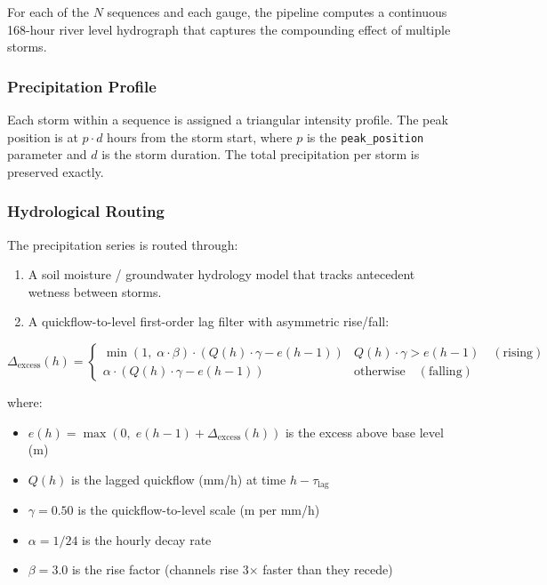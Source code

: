 \documentclass[11pt,a4paper]{article}
\begin{document}
For each of the $N$ sequences and each gauge, the pipeline computes a
continuous 168-hour river level hydrograph that captures the compounding
effect of multiple storms.

\subsubsection{Precipitation Profile}

Each storm within a sequence is assigned a triangular intensity profile.
The peak position is at $p \cdot d$ hours from the storm start, where $p$
is the \texttt{peak\_position} parameter and $d$ is the storm duration.
The total precipitation per storm is preserved exactly.

\subsubsection{Hydrological Routing}

The precipitation series is routed through:
\begin{enumerate}[nosep]
    \item A soil moisture / groundwater hydrology model that tracks
          antecedent wetness between storms.
    \item A quickflow-to-level first-order lag filter with asymmetric
          rise/fall:
\end{enumerate}

\[
\Delta_{\text{excess}}(h) = \begin{cases}
\min\!\left(1,\; \alpha \cdot \beta\right) \cdot
    \left(Q(h) \cdot \gamma - e(h{-}1)\right)
    & Q(h) \cdot \gamma > e(h{-}1) \quad (\text{rising}) \\[6pt]
\alpha \cdot
    \left(Q(h) \cdot \gamma - e(h{-}1)\right)
    & \text{otherwise} \quad (\text{falling})
\end{cases}
\]

\noindent where:
\begin{itemize}[nosep]
    \item $e(h) = \max(0,\; e(h{-}1) + \Delta_{\text{excess}}(h))$ is the
          excess above base level (m)
    \item $Q(h)$ is the lagged quickflow (mm/h) at time $h - \tau_{\text{lag}}$
    \item $\gamma = 0.50$ is the quickflow-to-level scale (m per mm/h)
    \item $\alpha = 1/24$ is the hourly decay rate
    \item $\beta = 3.0$ is the rise factor (channels rise 3$\times$ faster than they recede)
\end{itemize}
\end{document}

